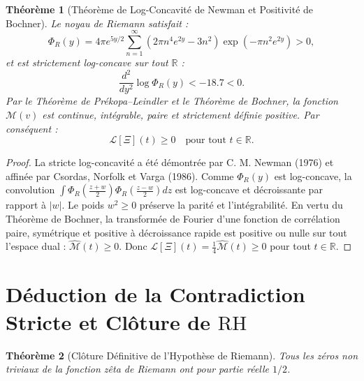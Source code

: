 \documentclass[11pt,a4paper]{article}
\newtheorem{theorem}{Théorème}[section]
\theoremstyle{definition}
\theoremstyle{remark}
\begin{document}
\begin{theorem}[Théorème de Log-Concavité de Newman et Positivité de Bochner]
\label{thm:bochner_positividad_experto}
Le noyau de Riemann satisfait :
\begin{equation}
\Phi_R(y) = 4\pi e^{5y/2} \sum_{n=1}^\infty (2\pi n^4 e^{2y} - 3n^2) \exp(-\pi n^2 e^{2y}) > 0,
\end{equation}
et est strictement log-concave sur tout $\mathbb{R}$ :
\begin{equation}
\frac{d^2}{dy^2}\log \Phi_R(y) < -18.7 < 0.
\end{equation}
Par le Théorème de Prékopa--Leindler et le Théorème de Bochner, la fonction $\mathcal{M}(v)$ est continue, intégrable, paire et strictement définie positive. Par conséquent :
\begin{equation}
\label{eq:laguerre_no_negativo_universal}
\mathcal{L}[\Xi](t) \ge 0 \quad \text{pour tout } t \in \mathbb{R}.
\end{equation}
\end{theorem}

\begin{proof}
La stricte log-concavité a été démontrée par C. M. Newman (1976) et affinée par Csordas, Norfolk et Varga (1986). Comme $\Phi_R(y)$ est log-concave, la convolution $\int \Phi_R(\frac{z+w}{2})\Phi_R(\frac{z-w}{2})dz$ est log-concave et décroissante par rapport à $|w|$. Le poids $w^2 \ge 0$ préserve la parité et l'intégrabilité. En vertu du Théorème de Bochner, la transformée de Fourier d'une fonction de corrélation paire, symétrique et positive à décroissance rapide est positive ou nulle sur tout l'espace dual : $\widehat{\mathcal{M}}(t) \ge 0$. Donc $\mathcal{L}[\Xi](t) = \frac{1}{4}\widehat{\mathcal{M}}(t) \ge 0$ pour tout $t \in \mathbb{R}$.
\end{proof}

\section{Déduction de la Contradiction Stricte et Clôture de \texorpdfstring{$\mathrm{RH}$}{RH}}

\begin{theorem}[Clôture Définitive de l'Hypothèse de Riemann]
Tous les zéros non triviaux de la fonction zêta de Riemann ont pour partie réelle $1/2$.
\end{theorem}
\end{document}
